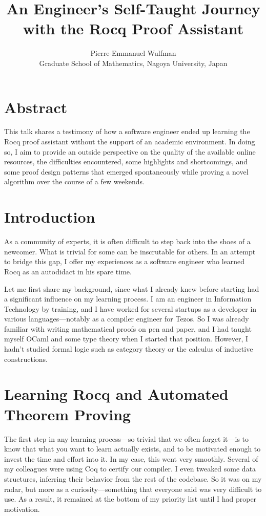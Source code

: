 \documentclass[11pt]{article}
\title{An Engineer’s Self-Taught Journey with the Rocq Proof Assistant}
\author{Pierre-Emmanuel Wulfman\\Graduate School of Mathematics, Nagoya University, Japan}
\date{}
\begin{document}
\maketitle

\section*{Abstract}
This talk shares a testimony of how a software engineer ended up learning the Rocq proof assistant without the support of an academic environment. In doing so, I aim to provide an outside perspective on the quality of the available online resources, the difficulties encountered, some highlights and shortcomings, and some proof design patterns that emerged spontaneously while proving a novel algorithm over the course of a few weekends.

\section{Introduction}
As a community of experts, it is often difficult to step back into the shoes of a newcomer. What is trivial for some can be inscrutable for others. In an attempt to bridge this gap, I offer my experiences as a software engineer who learned Rocq as an autodidact in his spare time.

Let me first share my background, since what I already knew before starting had a significant influence on my learning process. I am an engineer in Information Technology by training, and I have worked for several startups as a developer in various languages---notably as a compiler engineer for Tezos. So I was already familiar with writing mathematical proofs on pen and paper, and I had taught myself OCaml and some type theory when I started that position. However, I hadn’t studied formal logic such as category theory or the calculus of inductive constructions.

\section{Learning Rocq and Automated Theorem Proving}
The first step in any learning process---so trivial that we often forget it---is to know that what you want to learn actually exists, and to be motivated enough to invest the time and effort into it. In my case, this went very smoothly. Several of my colleagues were using Coq to certify our compiler. I even tweaked some data structures, inferring their behavior from the rest of the codebase. So it was on my radar, but more as a curiosity---something that everyone said was very difficult to use. As a result, it remained at the bottom of my priority list until I had proper motivation.
\end{document}
